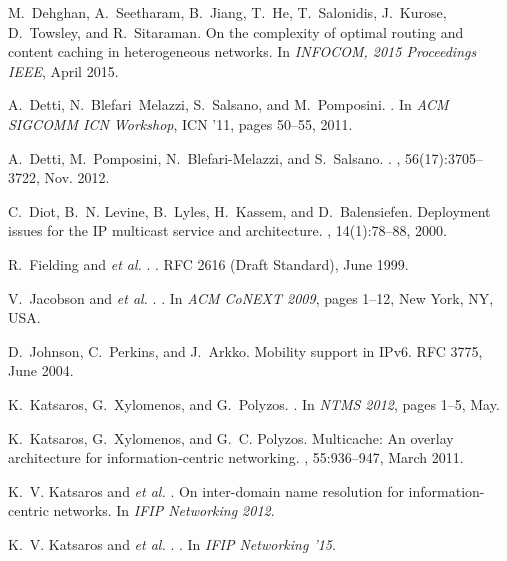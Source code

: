 \documentclass{sig-alternate}
\newcommand{\etal}{{\em et al. \/}}
\begin{document}
\begin{thebibliography}{10}
M.~Dehghan, A.~Seetharam, B.~Jiang, T.~He, T.~Salonidis, J.~Kurose, D.~Towsley,
  and R.~Sitaraman.
\newblock On the complexity of optimal routing and content caching in
  heterogeneous networks.
\newblock In {\em INFOCOM, 2015 Proceedings IEEE}, April 2015.

A.~Detti, N.~Blefari~Melazzi, S.~Salsano, and M.~Pomposini.
.
\newblock In {\em ACM SIGCOMM ICN Workshop}, ICN '11, pages 50--55, 2011.

A.~Detti, M.~Pomposini, N.~Blefari-Melazzi, and S.~Salsano.
.
, 56(17):3705--3722, Nov. 2012.

C.~Diot, B.~N. Levine, B.~Lyles, H.~Kassem, and D.~Balensiefen.
\newblock Deployment issues for the {IP} multicast service and architecture.
, 14(1):78--88, 2000.

R.~Fielding and \etal.
.
\newblock RFC 2616 (Draft Standard), June 1999.

V.~Jacobson and \etal.
.
\newblock In {\em {ACM} {CoNEXT} 2009}, pages 1--12, New York, NY, USA.

D.~Johnson, C.~Perkins, and J.~Arkko.
\newblock Mobility support in {IPv6}.
\newblock RFC 3775, June 2004.

K.~Katsaros, G.~Xylomenos, and G.~Polyzos.
.
\newblock In {\em NTMS 2012}, pages 1--5, May.

K.~Katsaros, G.~Xylomenos, and G.~C. Polyzos.
\newblock Multicache: An overlay architecture for information-centric
  networking.
, 55:936--947, March 2011.

K.~V. Katsaros and \etal.
\newblock On inter-domain name resolution for information-centric networks.
\newblock In {\em IFIP Networking 2012}.

K.~V. Katsaros and \etal.
.
\newblock In {\em IFIP Networking '15}.


\end{thebibliography}
\end{document}
